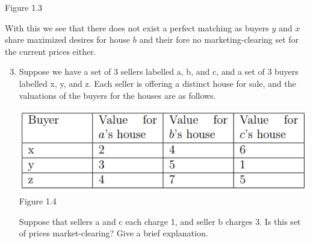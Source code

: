 \documentclass[11pt]{article}
\begin{document}
{\begin{enumerate}
\begin{center}
		Figure 1.3
	\end{center}
\end{enumerate}
With this we see that there does not exist a perfect matching as buyers $y$ and $x$ share maximized desires for house $b$ and their fore no marketing-clearing set for the current prices either.
}
	
\begin{enumerate}
	\setcounter{enumi}{2}
	\item Suppose we have a set of 3 sellers labelled a, b, and c, and a set of 3 buyers labelled x, y, and z. Each seller is offering a distinct house for sale, and the valuations of the buyers for the houses are as follows.
	\begin{center}
		\includegraphics[scale=1.5]{Figure1.4}\\
		Figure 1.4
	\end{center}
Suppose that sellers a and c each charge 1, and seller b charges 3. Is this set of prices market-clearing? Give a brief explanation.
\end{enumerate}
\end{document}
